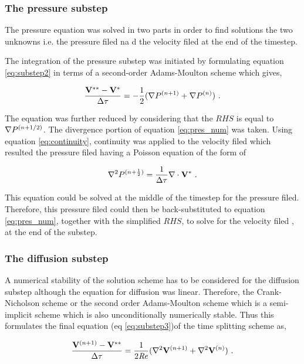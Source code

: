  
\subsubsection{The pressure substep}

The pressure equation was solved in two parts in order to find solutions the two unknowns i.e. the pressure filed na d the velocity filed at the end of the timestep. 
 
The integration of the pressure substep was initiated by formulating equation \ref{eq:substep2} in terms of a second-order Adams-Moulton scheme which gives,
 
\begin{equation} \centering
\label{eq:pres_num}
\frac{\Vintint - \Vint}{\Delta\tau} = -\frac{1}{2}(\grad\Pres^{(n+1)} + \grad\Pres^{(n)}) ~.
\end{equation}

The equation was further reduced by considering that the $RHS$ is equal to $\nabla P^{(n+1/2)}$. The divergence portion of equation \ref{eq:pres_num} was taken. Using equation \ref{eq:continuity}, continuity was applied to the velocity filed which resulted the pressure filed having a Poisson equation of the form of 

\begin{equation} \centering
\label{eq:poisson}
\gradsq\Pres^{(n+\frac{1}{2})} = \frac{1}{\Delta\tau}\divergence{\Vint} ~.
\end{equation} 

This equation could be solved at the middle of the timestep for the pressure filed. Therefore, this pressure filed could then be back-substituted to equation \ref{eq:pres_num}, together with the simplified $RHS$, to solve for the velocity filed \Vintint, at the end of the substep. 

\subsubsection{The diffusion substep}

A numerical stability of the solution scheme has to be considered for the diffusion substep although the equation for diffusion was linear. Therefore, the Crank-Nicholson scheme or the second order Adams-Moulton scheme which is a semi-implicit scheme which is also unconditionally numerically stable. Thus this formulates the final equation (eq \ref{eq:substep3})of the time splitting scheme as,

\begin{equation} \centering
\label{eq:diff_num}
\frac{\Vnext - \Vintint}{\Delta\tau} = \frac{1}{2\Rey}(\gradsq{\Vnext} + \gradsq{\vecV^{(n)}}) ~.
\end{equation}

